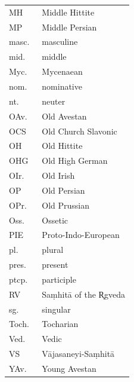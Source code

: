 \documentclass[output=paper,colorlinks,citecolor=brown]{langscibook}
\begin{document}
\begin{tabularx}{.48\textwidth}{lQ}
MH & Middle Hittite\\
MP & Middle Persian\\
masc.\ & masculine\\
mid.\ & middle\\
Myc.\ & Mycenaean\\
nom.\ & nominative\\
nt.\ & neuter\\
OAv.\ & Old Avestan\\
OCS & Old Church Slavonic\\
OH & Old Hittite\\
OHG	& Old High German\\
OIr.\ & Old Irish\\
OP & Old Persian\\
OPr.\ & Old Prussian\\
Oss.\ & Ossetic\\
PIE & Proto-Indo-European\\
pl.\ & plural\\
pres.\ & present\\
ptcp.\ & participle\\
RV & Saṃhitā of the R̥gveda\\
sg.\ & singular\\
Toch.\ & Tocharian\\
Ved.\ & Vedic\\
VS\ & Vājasaneyi-Saṃhitā\\
YAv.\ & Young Avestan\\
\end{tabularx}

{\sloppy\printbibliography[heading=subbibliography,notkeyword=this]}
\end{document}
